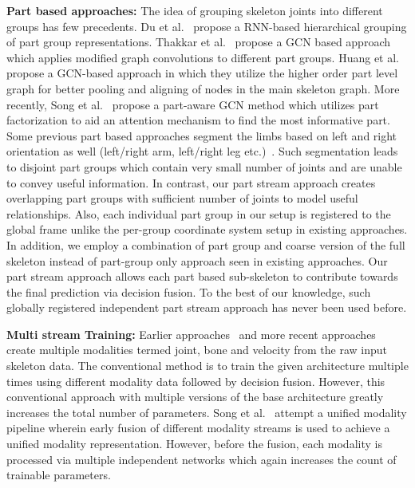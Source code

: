 \documentclass[runningheads]{llncs}
\begin{document}
\noindent \textbf{Part based approaches:} The idea of grouping skeleton joints into different groups has few precedents. Du et al.~\cite{7298714} propose a RNN-based hierarchical grouping of part group representations. Thakkar et al.~\cite{thakkar2018partbased} propose a GCN based approach which applies  modified graph convolutions to different part groups. Huang et al.~\cite{Huang_Huang_Ouyang_Wang_2020} propose a GCN-based approach in which they utilize the higher order part level graph for better pooling and aligning of nodes in the main skeleton graph.  More recently, Song et al.~\cite{song2020stronger} propose a part-aware GCN method which utilizes part factorization to aid an attention mechanism to find the most informative part. Some previous part based approaches segment the limbs based on left and right orientation as well (left/right arm, left/right leg etc.)~\cite{song2020stronger,thakkar2018partbased}. Such segmentation leads to disjoint part groups which contain very small number of joints and are unable to convey useful information. In contrast, our part stream approach creates overlapping part groups with sufficient number of joints to model useful relationships. Also, each individual part group in our setup is registered to the global frame unlike the per-group coordinate system setup in existing approaches. In addition, we employ a combination of part group and coarse version of the full skeleton instead of part-group only approach seen in existing approaches. Our part stream approach allows each part based sub-skeleton to contribute towards the final prediction via decision fusion. To the best of our knowledge, such globally registered independent part stream approach has never been used before.

\noindent \textbf{Multi stream Training:} Earlier approaches~\cite{shi2019two,cheng2020shiftgcn,liu2020disentangling} and more recent approaches~\cite{chen2021channel,xu2021topology} create multiple modalities termed joint, bone and velocity from the raw input skeleton data. The conventional method is to train the given architecture multiple times using different modality data followed by decision fusion. However, this conventional approach with multiple versions of the base architecture greatly increases the total number of parameters. Song et al.~\cite{song2020stronger} attempt a unified modality pipeline wherein early fusion of different modality streams is used to achieve a unified modality representation. However, before the fusion, each modality is processed via multiple independent networks which again increases the count of trainable parameters.
\end{document}
